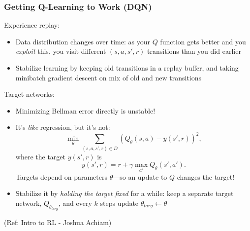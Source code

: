 \begin{frame}[fragile]\frametitle{Getting Q-Learning to Work (DQN)}

Experience replay:
\begin{itemize}
\item Data distribution changes over time: as your $Q$ function gets better and you \textit{exploit} this, you visit different $(s,a,s',r)$ transitions than you did earlier
\item Stabilize learning by keeping old transitions in a replay buffer, and taking minibatch gradient descent on mix of old and new transitions
\end{itemize}
Target networks:
\begin{itemize}
\item Minimizing Bellman error directly is unstable! 
\item It's \textit{like} regression, but it's not:
%
\begin{equation*}
\min_{\theta} \sum_{(s,a,s',r)\in D} \left(Q_{\theta}(s,a) - y(s',r) \right)^2,
\end{equation*}
%
where the target $y(s',r)$ is
%
\begin{equation*}
y(s',r) = r + \gamma \max_{a'} Q_{\theta}(s',a').
\end{equation*}
%
Targets depend on parameters $\theta$---so an update to $Q$ changes the target!
\item Stabilize it by \textit{holding the target fixed} for a while: keep a separate target network, $Q_{\theta_{targ}}$, and every $k$ steps update $\theta_{targ} \leftarrow \theta$
\end{itemize}
{\tiny (Ref: Intro to RL - Joshua Achiam)}


\end{frame}

